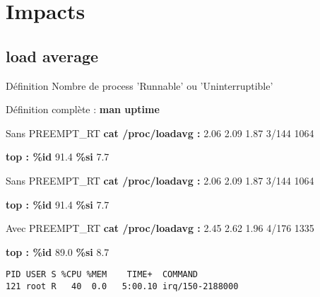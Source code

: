 \section{Impacts}
\subsection{load average}
\begin{frame}
	\begin{block}{Définition}
Nombre de process 'Runnable' ou 'Uninterruptible'

Définition complète : \textbf{man uptime}
	\end{block}
\end{frame}
\begin{frame}[containsverbatim]
	\begin{block}{Sans PREEMPT\_RT}
\textbf{cat /proc/loadavg : }
2.06 2.09 1.87 3/144 1064

\textbf{top : \%id }91.4 \textbf{\%si }7.7
	\end{block}
	\vspace{3.9cm}
\end{frame}

\begin{frame}[containsverbatim]
	\begin{block}{Sans PREEMPT\_RT}
\textbf{cat /proc/loadavg : }
2.06 2.09 1.87 3/144 1064

\textbf{top : \%id }91.4 \textbf{\%si }7.7
	\end{block}
	\begin{block}{Avec PREEMPT\_RT}
\textbf{cat /proc/loadavg : }
2.45 2.62 1.96 4/176 1335

\textbf{top : \%id }89.0 \textbf{\%si }8.7

	\begin{verbatim}
PID USER S %CPU %MEM    TIME+  COMMAND 
121 root R   40  0.0   5:00.10 irq/150-2188000
	\end{verbatim}
	\end{block}
\end{frame}

